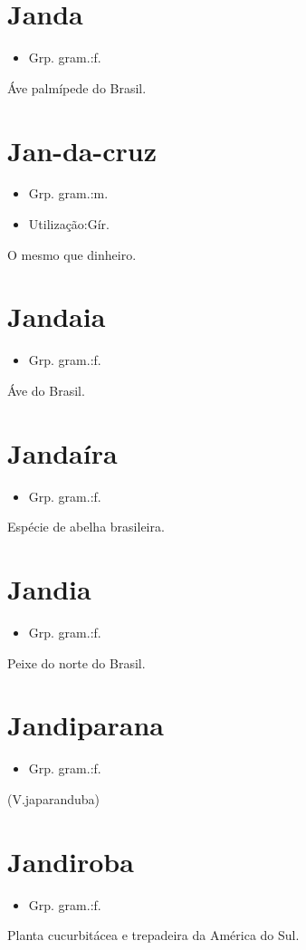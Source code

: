 \documentclass{article}
\begin{document}
\section{Janda}
\begin{itemize}
\item {Grp. gram.:f.}
\end{itemize}
Áve palmípede do Brasil.
\section{Jan-da-cruz}
\begin{itemize}
\item {Grp. gram.:m.}
\end{itemize}
\begin{itemize}
\item {Utilização:Gír.}
\end{itemize}
O mesmo que \textunderscore dinheiro\textunderscore .
\section{Jandaia}
\begin{itemize}
\item {Grp. gram.:f.}
\end{itemize}
Áve do Brasil.
\section{Jandaíra}
\begin{itemize}
\item {Grp. gram.:f.}
\end{itemize}
Espécie de abelha brasileira.
\section{Jandia}
\begin{itemize}
\item {Grp. gram.:f.}
\end{itemize}
Peixe do norte do Brasil.
\section{Jandiparana}
\begin{itemize}
\item {Grp. gram.:f.}
\end{itemize}
(V.japaranduba)
\section{Jandiroba}
\begin{itemize}
\item {Grp. gram.:f.}
\end{itemize}
Planta cucurbitácea e trepadeira da América do Sul.
\end{document}
